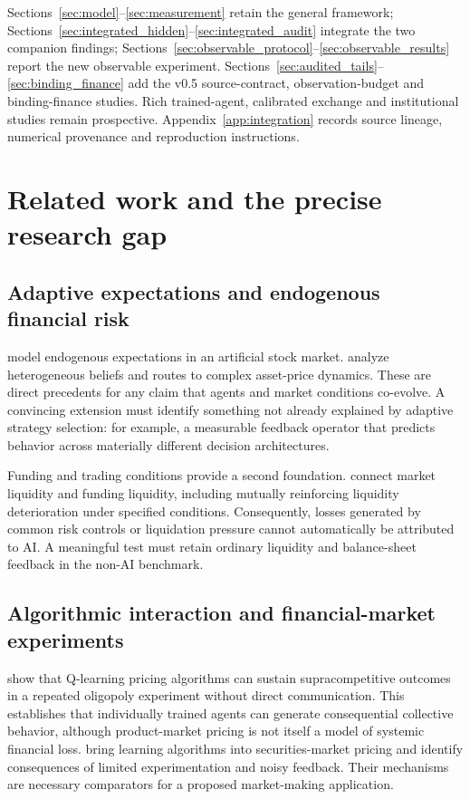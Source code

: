 \documentclass[11pt,a4paper]{article}
\theoremstyle{definition}
\theoremstyle{remark}
\begin{document}
Sections~\ref{sec:model}--\ref{sec:measurement} retain the general framework; Sections~\ref{sec:integrated_hidden}--\ref{sec:integrated_audit} integrate the two companion findings; Sections~\ref{sec:observable_protocol}--\ref{sec:observable_results} report the new observable experiment. Sections~\ref{sec:audited_tails}--\ref{sec:binding_finance} add the v0.5 source-contract, observation-budget and binding-finance studies. Rich trained-agent, calibrated exchange and institutional studies remain prospective. Appendix~\ref{app:integration} records source lineage, numerical provenance and reproduction instructions.

\section{Related work and the precise research gap}
\label{sec:related}
\subsection{Adaptive expectations and endogenous financial risk}
\citet{arthur1996} model endogenous expectations in an artificial stock market. \citet{brock1998} analyze heterogeneous beliefs and routes to complex asset-price dynamics. These are direct precedents for any claim that agents and market conditions co-evolve. A convincing extension must identify something not already explained by adaptive strategy selection: for example, a measurable feedback operator that predicts behavior across materially different decision architectures.

Funding and trading conditions provide a second foundation. \citet{brunnermeier2009} connect market liquidity and funding liquidity, including mutually reinforcing liquidity deterioration under specified conditions. Consequently, losses generated by common risk controls or liquidation pressure cannot automatically be attributed to AI. A meaningful test must retain ordinary liquidity and balance-sheet feedback in the non-AI benchmark.

\subsection{Algorithmic interaction and financial-market experiments}
\citet{calvano2020} show that Q-learning pricing algorithms can sustain supracompetitive outcomes in a repeated oligopoly experiment without direct communication. This establishes that individually trained agents can generate consequential collective behavior, although product-market pricing is not itself a model of systemic financial loss. \citet{colliard2026} bring learning algorithms into securities-market pricing and identify consequences of limited experimentation and noisy feedback. Their mechanisms are necessary comparators for a proposed market-making application.
\end{document}
